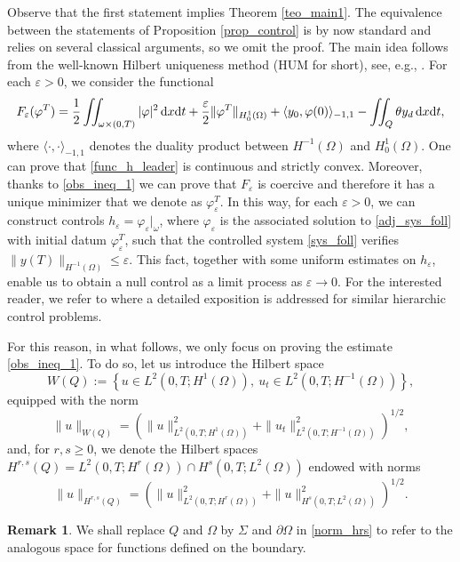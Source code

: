 \documentclass{dcds-bOF}
\theoremstyle{definition}
\newtheorem{remark}{Remark}
\def\dx{\,\textnormal{d}x}
\def\dt{\textnormal{d}t}
\begin{document}
Observe that the first statement implies Theorem \ref{teo_main1}. The equivalence between the statements of Proposition \ref{prop_control} is by now standard and relies on several classical arguments, so we omit the proof. The main idea follows from the well-known Hilbert uniqueness method (HUM for short), see, e.g., \cite{glo_lions_he,boyer_HUM}. For each $\varepsilon>0$, we consider the functional
%
\begin{equation}\label{func_h_leader}
F_\varepsilon(\varphi^T)=\frac{1}{2}\iint_{\omega\times(0,T)}|\varphi|^2\dx\dt+\frac{\varepsilon}{2}\|\varphi^T\|_{H_0^1(\Omega)}+\langle y_0,\varphi(0)\rangle_{-1,1}-\iint_{Q}\theta y_d\dx\dt,
\end{equation}
%
where $\langle\cdot,\cdot\rangle_{-1,1}$ denotes the duality product between $H^{-1}(\Omega)$ and $H_0^1(\Omega)$. One can prove that \eqref{func_h_leader} is continuous and strictly convex. Moreover, thanks to \eqref{obs_ineq_1} we can prove that $F_\varepsilon$ is coercive and therefore it has a unique minimizer that we denote as $\varphi_\varepsilon^T$. In this way, for each $\varepsilon>0$, we can construct controls $h_\varepsilon=\varphi_\varepsilon|_{\omega}$, where $\varphi_\varepsilon$ is the associated solution to \eqref{adj_sys_foll} with initial datum $\varphi_\varepsilon^T$, such that the controlled system \eqref{sys_foll} verifies $\|y(T)\|_{H^{-1}(\Omega)}\leq \varepsilon$. This fact, together with some uniform estimates on $h_\varepsilon$, enable us to obtain a null control as a limit process as $\varepsilon\to 0$. For the interested reader, we refer to \cite{araruna,vhs_deT_rob} where a detailed exposition is addressed for similar hierarchic control problems.

For this reason, in what follows, we only focus on proving the estimate \eqref{obs_ineq_1}. To do so, let us introduce the Hilbert space
%
\begin{equation*}
W(Q):=\left\{u\in L^2(0,T;H^1(\Omega)), \ u_t\in L^2(0,T;H^{-1}(\Omega)) \right\},
\end{equation*}
%
equipped with the norm
%
\begin{equation*}
\|u\|_{W(Q)}=\left(\|u\|_{L^2(0,T;H^1(\Omega))}^2+\|u_t\|^2_{L^2(0,T;H^{-1}(\Omega))}\right)^{1/2},
\end{equation*}
%
and, for $r,s\geq 0$, we denote the Hilbert spaces $H^{r,s}(Q)=L^2(0,T;H^r(\Omega))\cap H^s(0,T;L^2(\Omega))$ endowed with  norms
%
\begin{equation}\label{norm_hrs}
\|u\|_{H^{r,s}(Q)}=\left(\|u\|^2_{L^2(0,T;H^r(\Omega))}+\|u\|_{H^s(0,T;L^2(\Omega))}^2\right)^{1/2}.
\end{equation}
%
\begin{remark}
We shall replace $Q$ and $\Omega$ by $\Sigma$ and $\partial\Omega$ in \eqref{norm_hrs} to refer to the analogous space for functions defined on the boundary.
\end{remark}
\end{document}
